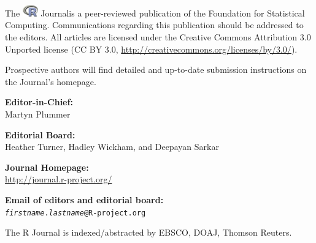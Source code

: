 \documentclass[a4paper,twoside]{report}
\begin{document}
\date{Month Year} %
\titlepage
\sectionhead{}

\vspace*{1in}
\begin{center}
\begin{minipage}{0.65\textwidth}
{\Large The  \includegraphics[height=5mm]{Rlogo} Journal}\quad is a peer-reviewed publication of
    the \R{} Foundation for Statistical Computing. Communications
    regarding this publication should be addressed to the editors. All
    articles are licensed under the Creative Commons Attribution 3.0 Unported
    license (CC BY 3.0, \url{http://creativecommons.org/licenses/by/3.0/}).
    \bigskip

    Prospective authors will find detailed and up-to-date submission
    instructions on the Journal's homepage.

\bigskip
    \begin{center}
      \textbf{Editor-in-Chief:}\\
      Martyn Plummer

    \bigskip
      \textbf{Editorial Board:}\\
      Heather Turner, Hadley Wickham, and Deepayan Sarkar

    \bigskip
    \textbf{\R{} Journal Homepage:}\\
    \url{http://journal.r-project.org/}
    
    \bigskip
    \textbf{Email of editors and editorial board:}\\
    \texttt{\textit{firstname}.\textit{lastname}@R-project.org}

    \bigskip The R Journal is indexed/abstracted by EBSCO, DOAJ, Thomson Reuters.  
      
  \end{center}
    
  \end{minipage}
\end{center}
  
\newpage

\begin{article}
  
\end{article}

\cleardoublepage

\end{document}
